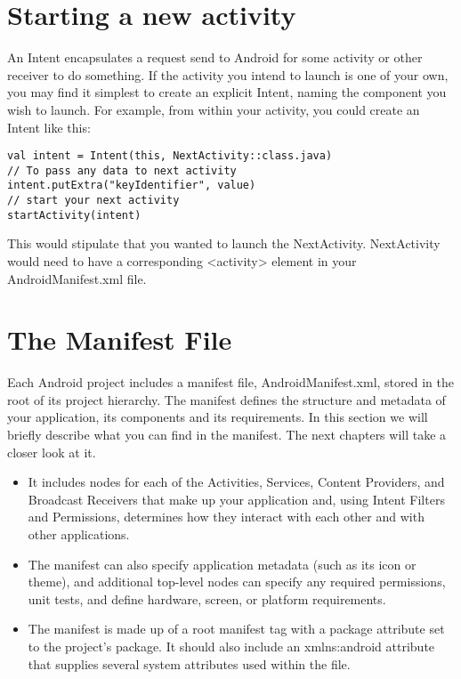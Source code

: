 



\section{Starting a new activity}
An Intent encapsulates a request send to Android for some activity or other receiver to do something.
If the activity you intend to launch is one of your own, you may find it simplest to create an explicit Intent, naming the component you wish to launch.
For example, from within your activity, you could create an Intent like this:

\begin{lstlisting}
val intent = Intent(this, NextActivity::class.java)
// To pass any data to next activity
intent.putExtra("keyIdentifier", value)
// start your next activity
startActivity(intent)
\end{lstlisting}

This would stipulate that you wanted to launch the NextActivity.
NextActivity would need to have a corresponding <activity> element in your AndroidManifest.xml file.

\section{The Manifest File}
Each Android project includes a manifest file, AndroidManifest.xml, stored in the root of its project hierarchy.
The manifest defines the structure and metadata of your application, its components and its requirements.
In this section we will briefly describe what you can find in the manifest.
The next chapters will take a closer look at it.

\begin{itemize}
	\item It includes nodes for each of the Activities, Services, Content Providers, and Broadcast Receivers that make up your application and, using Intent Filters and Permissions, determines how they interact with each other and with other applications.
	\item The manifest can also specify application metadata (such as its icon or theme), and additional top-level nodes can specify any required permissions, unit tests, and define hardware, screen, or platform requirements.
	\item The manifest is made up of a root manifest tag with a package attribute set to the project’s package.
		It should also include an xmlns:android attribute that supplies several system attributes used within the file.

\end{itemize}

